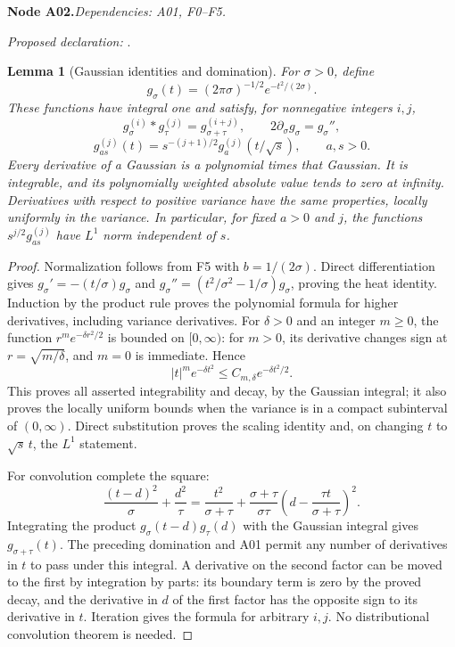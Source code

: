 \documentclass[11pt]{article}
\newtheorem{lemma}[theorem]{Lemma}
\theoremstyle{remark}\newtheorem{remark}[theorem]{Remark}
\newcommand{\bpnode}[3]{\par\Needspace{5\baselineskip}\noindent\textbf{Node #1.}\quad\textit{Dependencies: #2.}\par\noindent\textit{Proposed declaration:} \texttt{\detokenize{#3}}.\par\smallskip}
\begin{document}
\bpnode{A02}{A01, F0--F5}{gaussian_calculus}
\begin{lemma}[Gaussian identities and domination]\label{lem:gaussian-calculus}
For $\sigma>0$, define
\[
 g_\sigma(t)=(2\pi\sigma)^{-1/2}e^{-t^2/(2\sigma)}.
\]
These functions have integral one and satisfy, for nonnegative integers $i,j$,
\[
 g_\sigma^{(i)}*g_\tau^{(j)}=g_{\sigma+\tau}^{(i+j)},\qquad
 2\partial_\sigma g_\sigma=g_\sigma'',
\]
\[
 g_{as}^{(j)}(t)=s^{-(j+1)/2}g_a^{(j)}(t/\sqrt s),\qquad a,s>0.
\]
Every derivative of a Gaussian is a polynomial times that Gaussian. It is integrable, and its polynomially weighted absolute value tends to zero at infinity. Derivatives with respect to positive variance have the same properties, locally uniformly in the variance. In particular, for fixed $a>0$ and $j$, the functions $s^{j/2}g_{as}^{(j)}$ have $L^1$ norm independent of $s$.
\end{lemma}
\begin{proof}
Normalization follows from F5 with $b=1/(2\sigma)$. Direct differentiation gives $g_\sigma'=-(t/\sigma)g_\sigma$ and $g_\sigma''=(t^2/\sigma^2-1/\sigma)g_\sigma$, proving the heat identity. Induction by the product rule proves the polynomial formula for higher derivatives, including variance derivatives. For $\delta>0$ and an integer $m\ge0$, the function $r^me^{-\delta r^2/2}$ is bounded on $[0,\infty)$: for $m>0$, its derivative changes sign at $r=\sqrt{m/\delta}$, and $m=0$ is immediate. Hence
\[
 |t|^m e^{-\delta t^2}\le C_{m,\delta}e^{-\delta t^2/2}.
\]
This proves all asserted integrability and decay, by the Gaussian integral; it also proves the locally uniform bounds when the variance is in a compact subinterval of $(0,\infty)$. Direct substitution proves the scaling identity and, on changing $t$ to $\sqrt s\,t$, the $L^1$ statement.

For convolution complete the square:
\[
 \frac{(t-d)^2}{\sigma}+\frac{d^2}{\tau}
 =\frac{t^2}{\sigma+\tau}
  +\frac{\sigma+\tau}{\sigma\tau}
       \left(d-\frac{\tau t}{\sigma+\tau}\right)^2.
\]
Integrating the product $g_\sigma(t-d)g_\tau(d)$ with the Gaussian integral gives $g_{\sigma+\tau}(t)$. The preceding domination and A01 permit any number of derivatives in $t$ to pass under this integral. A derivative on the second factor can be moved to the first by integration by parts: its boundary term is zero by the proved decay, and the derivative in $d$ of the first factor has the opposite sign to its derivative in $t$. Iteration gives the formula for arbitrary $i,j$. No distributional convolution theorem is needed.
\end{proof}
\end{document}
